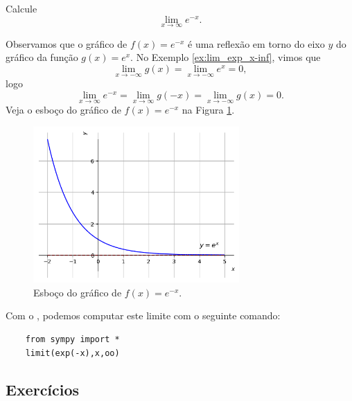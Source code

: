 \begin{exeresol}
  Calcule
  \begin{equation}
    \lim_{x\to \infty} e^{-x}.
  \end{equation}
\end{exeresol}
\begin{resol}
  Observamos que o gráfico de $f(x)=e^{-x}$ é uma reflexão em torno do eixo $y$ do gráfico da função $g(x)=e^x$. No Exemplo \ref{ex:lim_exp_x-inf}, vimos que
  \begin{equation}
    \lim_{x\to -\infty} g(x) = \lim_{x\to -\infty} e^{x} = 0,
  \end{equation}
  logo
  \begin{equation}
    \lim_{x\to \infty} e^{-x} = \lim_{x\to \infty} g(-x) = \lim_{x\to -\infty} g(x) = 0.
  \end{equation}
  Veja o esboço do gráfico de $f(x)=e^{-x}$ na Figura \ref{fig:exeresol_lim_exp_xinf}.

  \begin{figure}[H]
    \centering
    \includegraphics[width=0.7\textwidth]{./cap_lim/dados/fig_exeresol_lim_exp_xinf/fig_exeresol_lim_exp_xinf}
    \caption{Esboço do gráfico de $f(x)=e^{-x}$.}
    \label{fig:exeresol_lim_exp_xinf}
  \end{figure}  

  \ifispython
  Com o {\sympy}, podemos computar este limite com o seguinte comando:
  \begin{lstlisting}
    from sympy import *
    limit(exp(-x),x,oo)
  \end{lstlisting}
  \fi
\end{resol}

\subsection*{Exercícios}

